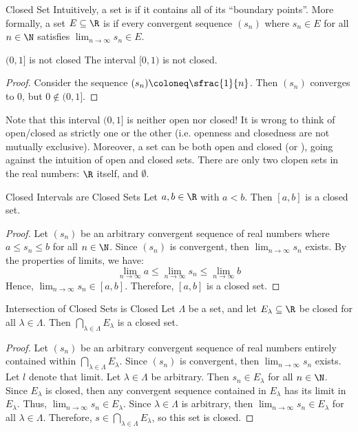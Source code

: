 \begin{dfnbox}{Closed Set}{}
    Intuitively, a set is  if it contains all of its ``boundary points''.
    \tcblower
    More formally, a set $E \subseteq \R$ is  if every convergent sequence $(s_n)$ where $s_n \in E$ for all $n \in \N$ satisfies $\lim_{n \to \infty} s_n \in E$.
\end{dfnbox}

\begin{exbox}{$(0,1]$ is not closed}{}
    The interval $[0,1)$ is not closed.
    \tcblower
    \begin{proof}
        Consider the sequence $(s_n) \coloneq \sfrac{1}{n}$. Then $(s_n)$ converges to $0$, but $0 \notin (0,1]$.
    \end{proof}
\end{exbox}

Note that this interval $(0, 1]$ is neither open nor closed! It is wrong to think of open/closed as strictly one or the other (i.e. openness and closedness are not mutually exclusive). Moreover, a set can be both open and closed (or ), going against the intuition of open and closed sets. There are only two clopen sets in the real numbers: $\R$ itself, and $\emptyset$.

\begin{lembox}{Closed Intervals are Closed Sets}{}
    Let $a,b \in \R$ with $a<b$. Then $[a,b]$ is a closed set.
    \tcblower
    \begin{proof}
        Let $(s_n)$ be an arbitrary convergent sequence of real numbers where $a \leq s_n \leq b$ for all $n \in \N$. Since $(s_n)$ is convergent, then $\lim_{n \to \infty} s_n$ exists. By the properties of limits, we have:
        \[ \lim_{n\to\infty} a \leq \lim_{n\to\infty} s_n \leq \lim_{n\to\infty} b \]
        Hence, $\lim_{n\to\infty} s_n \in [a,b]$. Therefore, $[a,b]$ is a closed set.
    \end{proof}
\end{lembox}

\begin{thmbox}{Intersection of Closed Sets is Closed}{}
    Let $\Lambda$ be a set, and let $E_\lambda \subseteq \R$ be closed for all $\lambda \in \Lambda$. Then $\bigcap_{\lambda \in \Lambda} E_\lambda$ is a closed set.
    \tcblower
    \begin{proof}
        Let $(s_n)$ be an arbitrary convergent sequence of real numbers entirely contained within $\bigcap_{\lambda \in \Lambda} E_\lambda$. Since $(s_n)$ is convergent, then $\lim_{n \to \infty} s_n$ exists. Let $l$ denote that limit. Let $\lambda \in \Lambda$ be arbitrary. Then $s_n \in E_\lambda$ for all $n \in \N$. Since $E_\lambda$ is closed, then any convergent sequence contained in $E_\lambda$ has its limit in $E_\lambda$. Thus, $\lim_{n \to \infty} s_n \in E_\lambda$. Since $\lambda \in \Lambda$ is arbitrary, then $\lim_{n \to \infty} s_n \in E_\lambda$ for all $\lambda \in \Lambda$. Therefore, $s \in \bigcap_{\lambda \in \Lambda} E_\lambda$, so this set is closed.
    \end{proof}
\end{thmbox}

